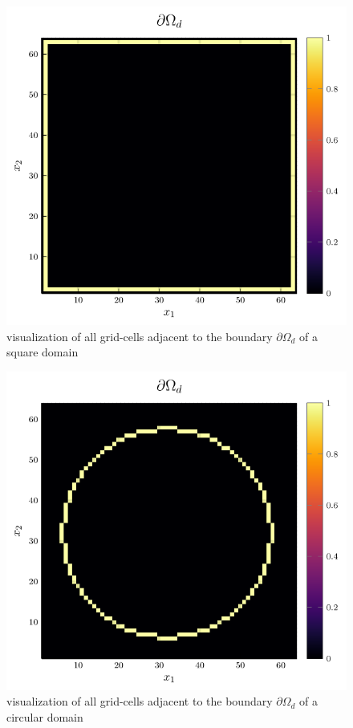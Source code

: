 \documentclass{mimosis}
\begin{document}
\begin{figure}[htbp]
\centering
\includegraphics[width=.9\linewidth]{images/boundary.png}
\caption{\label{fig:boundary-square}visualization of all grid-cells adjacent to the boundary \(\partial \Omega_{d}\) of a square domain}
\end{figure}




\begin{figure}[htbp]
\centering
\includegraphics[width=.9\linewidth]{images/boundary-circle.png}
\caption{\label{fig:boundary-circle}visualization of all grid-cells adjacent to the boundary \(\partial \Omega_{d}\) of a circular domain}
\end{figure}
\end{document}
